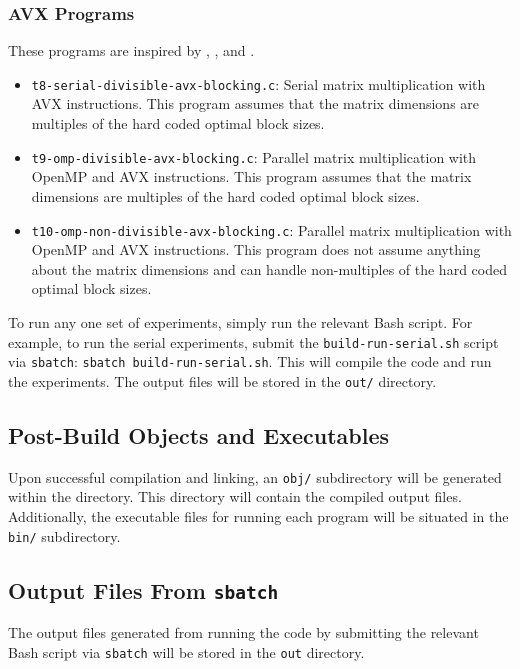 \documentclass{article}
\begin{document}
\subsubsection*{AVX Programs}
These programs are inspired by \cite{6877334}, \cite{ANATOMY}, and \cite{BLAS-P}.
\begin{itemize}
    \item \texttt{t8-serial-divisible-avx-blocking.c}: Serial matrix multiplication with AVX instructions. This program assumes
    that the matrix dimensions are multiples of the hard coded optimal block sizes.
    \item \texttt{t9-omp-divisible-avx-blocking.c}: Parallel matrix multiplication with OpenMP and AVX instructions. This program assumes
    that the matrix dimensions are multiples of the hard coded optimal block sizes.
    \item \texttt{t10-omp-non-divisible-avx-blocking.c}: Parallel matrix multiplication with OpenMP and AVX instructions. This program does not assume
    anything about the matrix dimensions and can handle non-multiples of the hard coded optimal block sizes.
\end{itemize}

\noindent To run any one set of experiments, simply run the relevant Bash script. For example, to run the serial experiments, submit the \texttt{build-run-serial.sh}
script via \texttt{sbatch}: \texttt{sbatch build-run-serial.sh}. This will compile the code and run the experiments. The output files will be stored in the \texttt{out/} directory.

\subsection{Post-Build Objects and Executables}
Upon successful compilation and linking, an \texttt{obj/} subdirectory will be generated within the directory. 
This directory will contain the compiled output files. Additionally, the executable files for running each program will be 
situated in the \texttt{bin/} subdirectory.

\subsection{Output Files From \texttt{sbatch}}
The output files generated from running the code by submitting the relevant Bash script via \texttt{sbatch} will be 
stored in the \texttt{out} directory. 



\end{document}
